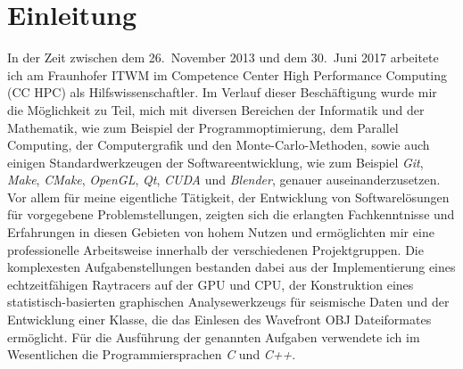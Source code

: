 \documentclass[crop=false]{standalone}
\begin{document}
  \section{Einleitung} %
  \label{sec:einleitung}
    In der Zeit zwischen dem 26.~November 2013 und dem 30.~Juni 2017 arbeitete ich am Fraunhofer ITWM im Competence Center High Performance Computing (CC HPC) als Hilfswissenschaftler.
    Im Verlauf dieser Beschäftigung wurde mir die Möglichkeit zu Teil, mich mit diversen Bereichen der Informatik und der Mathematik, wie zum Beispiel der Programmoptimierung, dem Parallel Computing, der Computergrafik und den Monte-Carlo-Methoden, sowie auch einigen Standardwerkzeugen der Softwareentwicklung, wie zum Beispiel \textit{Git}, \textit{Make}, \textit{CMake}, \textit{OpenGL}, \textit{Qt}, \textit{CUDA} und \textit{Blender}, genauer auseinanderzusetzen.
    Vor allem für meine eigentliche Tätigkeit, der Entwicklung von Softwarelösungen für vorgegebene Problemstellungen, zeigten sich die erlangten Fachkenntnisse und Erfahrungen in diesen Gebieten von hohem Nutzen und ermöglichten mir eine professionelle Arbeitsweise innerhalb der verschiedenen Projektgruppen.
    Die komplexesten Aufgabenstellungen bestanden dabei aus der Implementierung eines echtzeitfähigen Raytracers auf der GPU und CPU, der Konstruktion eines statistisch-basierten graphischen Analysewerkzeugs für seismische Daten und der Entwicklung einer Klasse, die das Einlesen des Wavefront OBJ Dateiformates ermöglicht.
    Für die Ausführung der genannten Aufgaben verwendete ich im Wesentlichen die Programmiersprachen \textit{C} und \textit{C++}.
\end{document}
